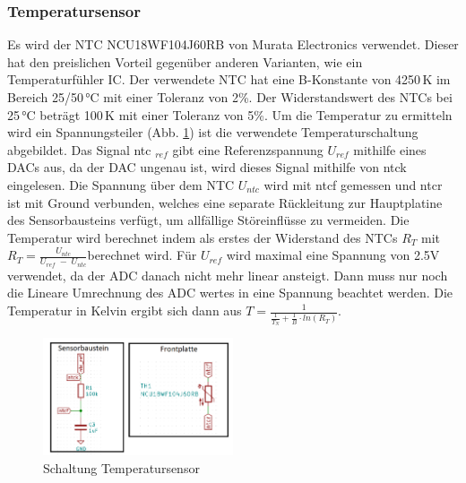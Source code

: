 \subsubsection{Temperatursensor}
Es wird der NTC NCU18WF104J60RB von Murata Electronics verwendet. Dieser hat den preislichen Vorteil gegenüber anderen Varianten, wie ein Temperaturfühler IC. Der verwendete NTC hat eine B-Konstante von 4250\,K im Bereich 25/50\,°C mit einer Toleranz von 2\%. Der Widerstandswert des NTCs bei 25\,°C beträgt 100\,K mit einer Toleranz von 5\%. Um die Temperatur zu ermitteln wird ein Spannungsteiler (Abb. \ref{pic: Temperatursensor}) ist die verwendete Temperaturschaltung abgebildet. Das Signal ntc $_{ref}$ gibt eine Referenzspannung $U_{ref}$ mithilfe eines DACs aus, da der DAC ungenau ist, wird dieses Signal mithilfe von ntck eingelesen. Die Spannung über dem NTC $U_{ntc}$ wird mit ntcf gemessen und ntcr ist mit Ground verbunden, welches eine separate Rückleitung zur Hauptplatine des Sensorbausteins verfügt, um allfällige Störeinflüsse zu vermeiden. Die Temperatur wird berechnet indem als erstes der Widerstand des NTCs $R_T$ mit $R_T = \frac{U_{ntc}}{U_{ref}\;-\;U_{ntc}}$berechnet wird. Für $U_{ref}$ wird maximal eine Spannung von 2.5V verwendet, da der ADC danach nicht mehr linear ansteigt. Dann muss nur noch die Lineare Umrechnung des ADC wertes in eine Spannung beachtet werden. Die Temperatur in Kelvin ergibt sich dann aus $T = \frac{1}{\frac{1}{T_N}+\frac{1}{B} \cdot ln(R_T)}$.
\begin{figure}[h!]
	\centering
	\includegraphics[width=0.5\textwidth]{graphics/shematics_sensor_Temp.png}
	\caption{Schaltung Temperatursensor}
	\label{pic: Temperatursensor}
\end{figure}

